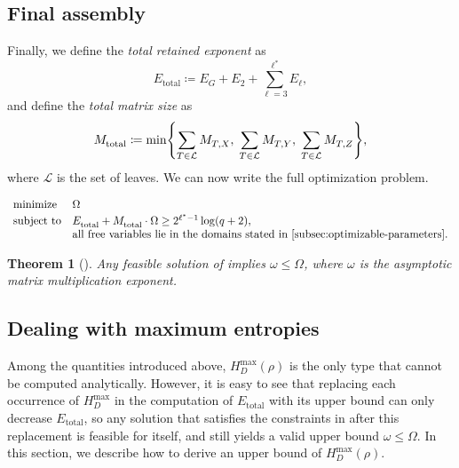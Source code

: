 \documentclass[11pt, a4paper, copyright, gdm]{google}
\theoremstyle{definition}
\theoremstyle{remark}
\theoremstyle{plain}
\newtheorem{theorem}{Theorem}
\newcommand{\defn}[1]{{\emph{{#1}}}}
\newcommand{\defeq}{\coloneqq}
\DeclarePairedDelimiter{\BK}{\{}{\}}
\begin{document}
\subsection{Final assembly}
Finally, we define the \defn{total retained exponent} as
\[
  E_{\text{total}}^{} \defeq E_G^{} + E_2^{} + \sum_{\ell=3}^{\ell^*} E_\ell^{},
\]
and define the \defn{total matrix size} as
\[
  M_{\text{total}}^{} \defeq \min\BK*{\sum_{T \in \mathcal{L}} M_{T,X}^{}, \; \sum_{T \in \mathcal{L}} M_{T,Y}^{}, \; \sum_{T \in \mathcal{L}} M_{T,Z}^{}},
\]
where $\mathcal{L}$ is the set of leaves. We can now write the full optimization problem.

\begin{tcolorbox}[
    colback=white, %
    colframe=gray!50!black, %
    sharp corners, 
    boxrule=0.5pt,
    left=5pt, right=5pt, top=5pt, bottom=5pt
]
\begin{equation}
  \begin{array}{ll}
    \text{minimize} & \Omega                                                                                       \\[0.2em]
    \text{subject to}
                    & E_{\text{total}}^{} + M_{\text{total}}^{} \cdot \Omega \ge 2^{\ell^*-1} \log(q + 2),               \\
                    & \text{all free variables lie in the domains stated in \cref{subsec:optimizable-parameters}.}
  \end{array}
  \label{eq:optimization-problem}
\end{equation}
\end{tcolorbox}

\begin{theorem}[\cite{alman2025more}]
Any feasible solution of  implies $\omega \le \Omega$, where $\omega$ is the asymptotic matrix multiplication exponent.
\end{theorem}

\subsection{Dealing with maximum entropies}
\label{subsec:max-entropy-certification}
Among the quantities introduced above, $H_D^{\max}(\rho)$ is the only type that cannot be computed analytically. However, it is easy to see that replacing each occurrence of $H_D^{\max}$ in the computation of $E_{\text{total}}^{}$ with its upper bound can only decrease $E_{\text{total}}^{}$, so any solution that satisfies the constraints in  after this replacement is feasible for  itself, and still yields a valid upper bound $\omega \le \Omega$. In this section, we describe how to derive an upper bound of $H_D^{\max}(\rho)$.
\end{document}
